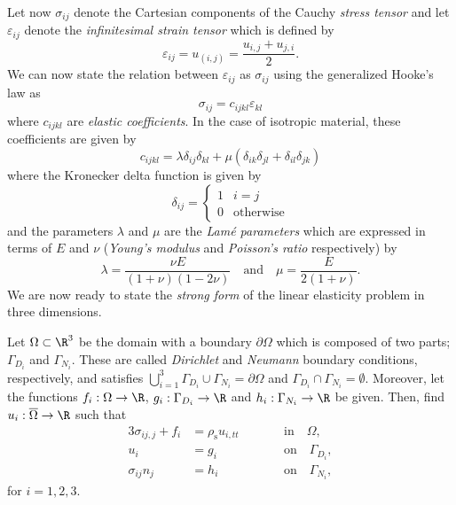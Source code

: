 Let now $\sigma_{ij}$ denote the Cartesian components of the Cauchy \textit{stress tensor} and let $\varepsilon_{ij}$ denote the \textit{infinitesimal strain tensor} which is defined by
\begin{equation*}
	\varepsilon_{ij} = u_{(i,j)} = \frac{u_{i,j}+u_{j,i}}{2}.
\end{equation*}
We can now state the relation between $\varepsilon_{ij}$ as $\sigma_{ij}$ using the generalized Hooke's law as
\begin{equation*}
	\sigma_{ij} = c_{ijkl}\varepsilon_{kl}
\end{equation*}
where $c_{ijkl}$ are \textit{elastic coefficients}. In the case of isotropic material, these coefficients are given by
\begin{equation*}
	c_{ijkl} = \lambda\delta_{ij}\delta_{kl} +\mu\left(\delta_{ik}\delta_{jl}+\delta_{il}\delta_{jk}\right)
\end{equation*}
where the Kronecker delta function is given by
\begin{equation*}
	\delta_{ij}=\begin{cases}
	1 &i=j\\
	0&\text{otherwise}
	\end{cases}
\end{equation*}
and the parameters $\lambda$ and $\mu$ are the \textit{Lamé parameters} which are expressed in terms of $E$ and $\nu$ (\textit{Young's modulus} and \textit{Poisson's ratio} respectively) by
\begin{equation*}
	\lambda=\frac{\nu E}{(1+\nu)(1-2\nu)}\quad\text{and}\quad\mu = \frac{E}{2(1+\nu)}.
\end{equation*}
We are now ready to state the \textit{strong form} of the linear elasticity problem in three dimensions. 

Let $\Omega\subset\R^3$ be the domain with a boundary $\partial \Omega$ which is composed of two parts; $\Gamma_{D_i}$ and $\Gamma_{N_i}$. These are called \textit{Dirichlet} and \textit{Neumann} boundary conditions, respectively, and satisfies $\bigcup_{i=1}^3\Gamma_{D_i}\cup\Gamma_{N_i}=\partial\Omega$ and $\Gamma_{D_i}\cap\Gamma_{N_i}=\emptyset$. Moreover, let the functions $f_i:\Omega\to\R$, $g_i:\Gamma_{D_i}\to\R$ and $h_i:\Gamma_{N_i}\to\R$ be given. Then, find $u_i:\overline{\Omega}\to\R$ such that
\begin{alignat}{3}
	\sigma_{ij,j} + f_i &= \rho_{\mathrm{s}} u_{i,tt}\qquad 	&&\text{in}\quad \Omega,\label{Eq2:mainDiffEqn}\\
	u_i &= g_i						&&\text{on}\quad \Gamma_{D_i},\label{Eq2:mainDiffEqnBC1}\\
	\sigma_{ij} n_j &= h_i 			&&\text{on}\quad \Gamma_{N_i},\label{Eq2:mainDiffEqnBC2}
\end{alignat}
for $i=1,2,3$.


